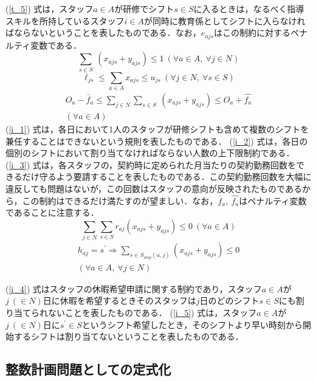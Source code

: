 \documentclass[twocolumn]{jsarticle}
\begin{document}
(\ref{t_5}) 式は，スタッフ$a \in A$が研修でシフト$s \in S$に入るときは，なるべく指導スキルを所持しているスタッフ$i \in A$が同時に教育係としてシフトに入らなければならないということを表したものである．なお，$e_{ajs}$はこの制約に対するペナルティ変数である．
\begin{equation}
\sum_{s \in S} \ (x_{ajs} + y_{ajs}) \leq 1 \ (\forall a \in A, \ \forall j \in N)
\label{i_1}
\end{equation}
\begin{equation}
\ell_{js} \leq \sum_{a \in A} x_{ajs} \leq u_{js} \ (\forall j \in N, \ \forall s \in S)
\label{i_2}
\end{equation}
\begin{eqnarray}
O_a - \check{f_a} \leq \sum_{j \in N}\sum_{s \in S} \ (x_{ajs} + y_{ajs}) \leq O_a + \hat{f_a} \nonumber \\ (\forall a \in A) \ \ \ \
\label{i_3}
\end{eqnarray}
(\ref{i_1}) 式は，各日において1人のスタッフが研修シフトも含めて複数のシフトを兼任することはできないという規則を表したものである． (\ref{i_2}) 式は，各日の個別のシフトにおいて割り当てなければならない人数の上下限制約である． (\ref{i_3}) 式は，各スタッフの，契約時に定められた月当たりの契約勤務回数をできるだけ守るよう要請することを表したものである．この契約勤務回数を大幅に違反しても問題はないが，この回数はスタッフの意向が反映されたものであるから，この制約はできるだけ満たすのが望ましい．なお，$ \check{f_a}, \  \hat{f_a} $はペナルティ変数であることに注意する．
\begin{equation}
\sum_{j \in N}\sum_{s \in S}r_{aj} (x_{ajs} + y_{ajs}) \leq 0 \ (\forall a \in A)
\label{i_4}
\end{equation}
\begin{eqnarray}
h_{aj} = s^{\prime} \Rightarrow \sum_{s \in S_{imp}(a, j)} (x_{ajs} + y_{ajs}) \leq 0 \nonumber \\ (\forall a \in A, \ \forall j \in N)
\label{i_5}
\end{eqnarray}

 (\ref{i_4}) 式はスタッフの休暇希望申請に関する制約であり，スタッフ$a \in A$が$j \ (\in N)$日に休暇を希望するときそのスタッフは$j$日のどのシフト$s \in S$にも割り当てられないことを表したものである． (\ref{i_5}) 式は，スタッフ$a \in A$が$j \ (\in N)$日に$s^{\prime} \in S$というシフト希望したとき，そのシフトより早い時刻から開始するシフトは割り当てないということを表したものである．

\vspace{\baselineskip}
\subsection{整数計画問題としての定式化}
\end{document}
